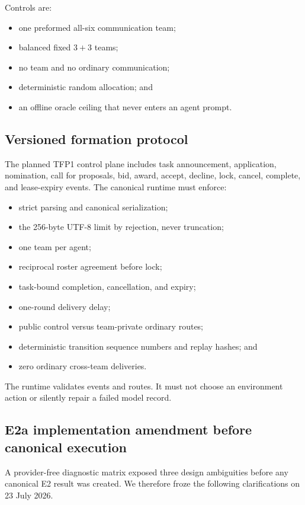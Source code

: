 \documentclass[11pt]{article}
\begin{document}
Controls are:

\begin{itemize}
  \item one preformed all-six communication team;
  \item balanced fixed $3+3$ teams;
  \item no team and no ordinary communication;
  \item deterministic random allocation; and
  \item an offline oracle ceiling that never enters an agent prompt.
\end{itemize}

\subsection{Versioned formation protocol}

The planned TFP1 control plane includes task announcement, application,
nomination, call for proposals, bid, award, accept, decline, lock, cancel,
complete, and lease-expiry events.  The canonical runtime must enforce:

\begin{itemize}
  \item strict parsing and canonical serialization;
  \item the 256-byte UTF-8 limit by rejection, never truncation;
  \item one team per agent;
  \item reciprocal roster agreement before lock;
  \item task-bound completion, cancellation, and expiry;
  \item one-round delivery delay;
  \item public control versus team-private ordinary routes;
  \item deterministic transition sequence numbers and replay hashes; and
  \item zero ordinary cross-team deliveries.
\end{itemize}

The runtime validates events and routes.  It must not choose an environment
action or silently repair a failed model record.

\subsection{E2a implementation amendment before canonical execution}

A provider-free diagnostic matrix exposed three design ambiguities before any
canonical E2 result was created.  We therefore froze the following
clarifications on 23 July 2026.
\end{document}

